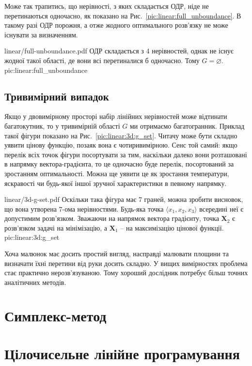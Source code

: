 \documentclass[\main/book.tex]{subfiles}
\begin{document}
Може так трапитись, що нерівності, з яких складається ОДР, ніде не перетинаються одночасно, як показано на Рис.~\ref{pic:linear:full_unboundance}. В такому разі ОДР порожня, а отже жодного оптимального розв'язку не може існувати за визначенням.

\illustration
 {linear/full-unboundance.pdf}
 {ОДР складається з 4 нерівностей, однак не існує жодної такої області, де вони всі перетиналися б одночасно. Тому $G = \varnothing$.}
 {pic:linear:full_unboundance}

\subsection{Тривимірний випадок}

Якщо у двовимірному просторі набір лінійних нерівностей може відтинати багатокутник, то у тривимірній області $G$ ми отримаємо багатогранник. Приклад такої фігури показано на Рис.~\ref{pic:linear:3d:g_set}. Читачу може бути складно уявити цінову функцію, позаяк вона є чотиривимірною. Сенс той самий: якщо перелік всіх точок фігури посортувати за тим, наскільки \flqq{}далеко\frqq{} вони розташовані в напрямку вектора-градієнта, то це одночасно буде перелік, посортований за зростанням оптимальності. Можна ще уявити це як зростання температури, яскравості чи будь-якої іншої зручної характеристики в певному напрямку.

\illustration
 {linear/3d-g-set.pdf}
 {Оскільки така фігура має 7 граней, можна зробити висновок, що вона утворена 7-ома нерівностями. Будь-яка точка $\langle x_1, x_2, x_3 \rangle$ всередині неї є допустимим розв'язком. Зважаючи на напрямок вектора градієнту, точка $\mathbf{X}_2$ є розв'язком задачі на мінімізацію, а $\mathbf{X}_1$ -- на максимізацію цінової функції.}
 {pic:linear:3d:g_set}
 
\begin{note}
 Хоча малюнок має досить простий вигляд, насправді малювати площини та визначати їхні перетини від руки досить складно. У вищих вимірностях проблема стає практично нерозв'язуваною. Тому хороший дослідник потребує більш точних аналітичних методів.
\end{note}


\section{Симплекс-метод}
\label{section:linear:simplex}

\section{Цілочисельне лінійне програмування}
\label{section:linear:integer}
\end{document}
